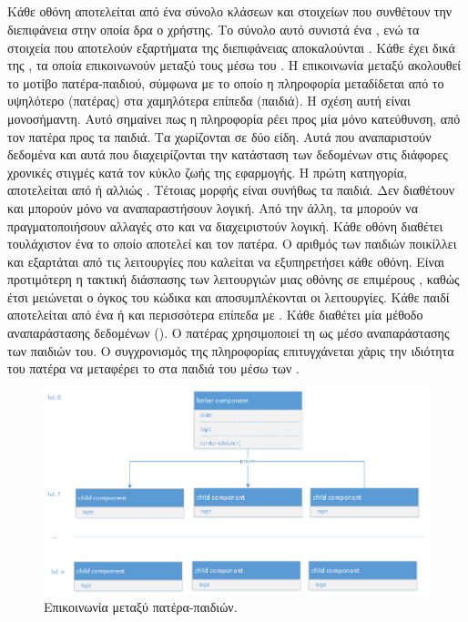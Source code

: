 \subsection{}
Κάθε οθόνη αποτελείται από ένα σύνολο κλάσεων και στοιχείων που συνθέτουν την διεπιφάνεια στην οποία δρα ο χρήστης. Το σύνολο αυτό συνιστά ένα , ενώ τα στοιχεία που αποτελούν εξαρτήματα της διεπιφάνειας αποκαλούνται . Κάθε  έχει δικά της , τα οποία επικοινωνούν μεταξύ τους μέσω του . Η επικοινωνία μεταξύ  ακολουθεί το μοτίβο πατέρα-παιδιού, σύμφωνα με το οποίο η πληροφορία μεταδίδεται από το υψηλότερο (πατέρας) στα χαμηλότερα επίπεδα (παιδιά). Η σχέση αυτή είναι μονοσήμαντη. Αυτό σημαίνει πως η πληροφορία ρέει προς μία μόνο κατεύθυνση, από τον πατέρα προς τα παιδιά. \newline
\indent
Τα  χωρίζονται σε δύο είδη. Αυτά που αναπαριστούν δεδομένα και αυτά που διαχειρίζονται την κατάσταση των δεδομένων στις διάφορες χρονικές στιγμές κατά τον κύκλο ζωής της εφαρμογής. Η πρώτη κατηγορία, αποτελείται από  ή αλλιώς . Τέτοιας μορφής είναι συνήθως τα παιδιά. Δεν διαθέτουν  και μπορούν μόνο να αναπαραστήσουν λογική. Από την άλλη, τα  μπορούν να πραγματοποιήσουν αλλαγές στο  και να διαχειριστούν λογική. Κάθε οθόνη διαθέτει τουλάχιστον ένα  το οποίο αποτελεί και τον πατέρα. Ο αριθμός των παιδιών ποικίλλει και εξαρτάται από τις λειτουργίες που καλείται να εξυπηρετήσει κάθε οθόνη. Είναι προτιμότερη η τακτική διάσπασης των λειτουργιών μιας οθόνης σε επιμέρους , καθώς έτσι μειώνεται ο όγκος του κώδικα και αποσυμπλέκονται οι λειτουργίες. Κάθε παιδί αποτελείται από ένα ή και περισσότερα επίπεδα με .
Κάθε  διαθέτει μία μέθοδο αναπαράστασης δεδομένων (). Ο πατέρας χρησιμοποιεί τη  ως μέσο αναπαράστασης των παιδιών του. Ο συγχρονισμός της πληροφορίας επιτυγχάνεται χάρις την ιδιότητα του πατέρα να μεταφέρει το  στα παιδιά του μέσω των .

\begin{figure}[h]
    \centering
    \includegraphics[scale=0.5]{figures/father-children.png}
    \caption{Επικοινωνία μεταξύ πατέρα-παιδιών.}
    \label{fatherchild}
\end{figure}

